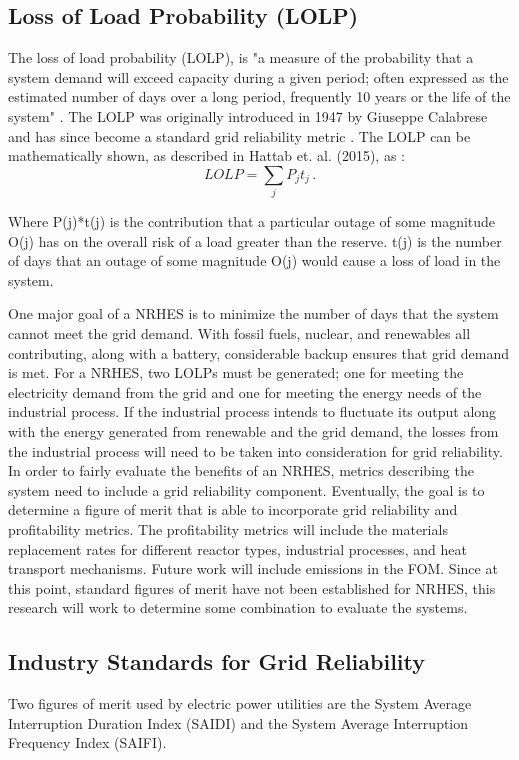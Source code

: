 \documentclass[12pt]{UIdahoMastersThesis}
\begin{document}
\subsection{Loss of Load Probability (LOLP)}

The loss of load probability (LOLP), is "a measure of the probability that a system demand will exceed capacity during a given period; often expressed as the estimated number of days over a long period, frequently 10 years or the life of the system" \cite{Electromn}. The LOLP was originally introduced in 1947 by Giuseppe Calabrese and has since become a standard grid reliability metric \cite{calabrese1947generating}. The LOLP can be mathematically shown, as described in Hattab et. al. (2015), as \cite{Hattab2015}:
\begin{equation*}
LOLP =\sum_{j} P_jt_j\,.
\end{equation*}

Where P(j)*t(j) is the contribution that a particular outage of some magnitude O(j) has on the overall risk of a load greater than the reserve. t(j) is the number of days that an outage of some magnitude O(j) would cause a loss of load in the system\cite{Hattab2015}.

One major goal of a NRHES is to minimize the number of days that the system cannot meet the grid demand.  With fossil fuels, nuclear, and renewables all contributing, along with a battery, considerable backup ensures that grid demand is met. For a NRHES, two LOLPs must be generated; one for meeting the electricity demand from the grid and one for meeting the energy needs of the industrial process.  If the industrial process intends to fluctuate its output along with the energy generated from renewable and the grid demand, the losses from the industrial process will need to be taken into consideration for grid reliability. In order to fairly evaluate the benefits of an NRHES, metrics describing the system need to include a grid reliability component.
Eventually, the goal is to determine a figure of merit that is able to incorporate grid reliability and profitability metrics.  The profitability metrics will include the materials replacement rates for different reactor types, industrial processes, and heat transport mechanisms. Future work will include emissions in the FOM. Since at this point, standard figures of merit have not been established for NRHES, this research will work to determine some combination to evaluate the systems.

\subsection{Industry Standards for Grid Reliability}
Two figures of merit used by electric power utilities are the System Average Interruption Duration Index (SAIDI) and the System Average Interruption Frequency Index (SAIFI).
\end{document}
